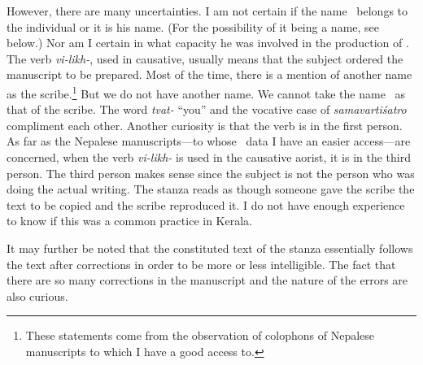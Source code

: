 However, there are many uncertainties. I am not certain if the name \Gargya\ belongs to the individual or it is his \gotra{} name. (For the possibility of it being a \gotra{} name, see below.) Nor am I certain in what capacity he was involved in the production of \Tm. The verb \emph{vi-likh-}, used in causative, usually means that the subject ordered the manuscript to be prepared. Most of the time, there is a mention of another name as the scribe.\footnote{These statements come from the observation of colophons of Nepalese manuscripts to which I have a good access to.}  But we do not have another name. We cannot take the name \Samavartisatru\ as that of the scribe. The word \emph{tvat-} “you” and the vocative case of \emph{samavartiśatro} compliment each other. Another curiosity is that the verb is in the first person. As far as the Nepalese manuscripts---to whose \colophon\ data I have an easier access---are concerned, when the verb \emph{vi-likh-} is used in the causative aorist, it is in the third person. The third person makes sense since the subject is not the person who was doing the actual writing. The stanza reads as though someone gave the scribe the text to be copied and the scribe reproduced it. I do not have enough experience to know if this was a common practice in Kerala.
%

It may further be noted that the constituted text of the stanza essentially follows the text after corrections in order to be more or less intelligible. The fact that there are so many corrections in the manuscript and the nature of the errors are also curious. 

